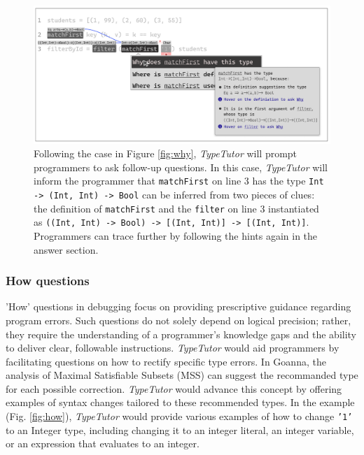 \begin{figure}[hbt]
  \includegraphics[width=\linewidth]{FollowUp}
  \caption[An example of \textit{TypeTutor} providing further explanation based on previous response (follow-up questions)]{
    \label{fig:follow-up}
     Following the case in Figure \ref{fig:why}, \textit{TypeTutor} will prompt programmers to ask follow-up questions. In this case, \textit{TypeTutor} will inform the programmer that \texttt{matchFirst} on line 3 has the type \texttt{Int -> (Int, Int) -> Bool} can be inferred from two pieces of clues:  the definition of \texttt{matchFirst} and the \texttt{filter} on line 3 instantiated as \texttt{((Int, Int) -> Bool) -> [(Int, Int)] -> [(Int, Int)]}. Programmers can trace further by following the hints again in the answer section.
    }
\end{figure}

\subsubsection{How questions}

'How' questions in debugging focus on providing prescriptive guidance regarding program errors. Such questions do not solely depend on logical precision; rather, they require the understanding of a programmer's knowledge gaps and the ability to deliver clear, followable instructions. \textit{TypeTutor} would aid programmers by facilitating questions on how to rectify specific type errors. In Goanna, the analysis of Maximal Satisfiable Subsets (MSS) can suggest the recommanded type for each possible correction. \textit{TypeTutor} would advance this concept by offering examples of syntax changes tailored to these recommended types. In the example (Fig. \ref{fig:how}), \textit{TypeTutor} would provide various examples of how to change \texttt{'1'} to an Integer type, including changing it to an integer literal, an integer variable, or an expression that evaluates to an integer. 




